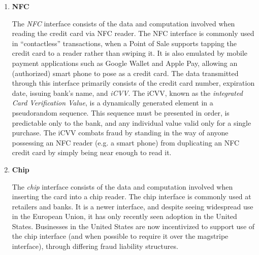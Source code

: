 \begin{enumerate}
\item \textbf{NFC}

The \emph{NFC} interface consists of the data and computation involved when reading the credit card via NFC reader.
The NFC interface is commonly used in ``contactless'' transactions, when a Point of Sale supports tapping the credit card to a reader rather than swiping it.
It is also emulated by mobile payment applications such as Google Wallet and Apple Pay, allowing an (authorized) smart phone to pose as a credit card.
The data transmitted through this interface primarily consists of the credit card number, expiration date, issuing bank's name, and \emph{iCVV}.
The iCVV, known as the \emph{integrated Card Verification Value}, is a dynamically generated element in a pseudorandom sequence.
This sequence must be presented in order, is predictable only to the bank, and any individual value valid only for a single purchase.
The iCVV combats fraud by standing in the way of anyone possessing an NFC reader (e.g. a smart phone) from duplicating an NFC credit card by simply being near enough to read it.

\item \textbf{Chip}

The \emph{chip} interface consists of the data and computation involved when inserting the card into a chip reader.
The chip interface is commonly used at retailers and banks.
It is a newer interface, and despite seeing widespread use in the European Union, it has only recently seen adoption in the United States.
Businesses in the United States are now incentivized to support use of the chip interface (and when possible to require it over the magstripe interface), through differing fraud liability structures.
\end{enumerate}
